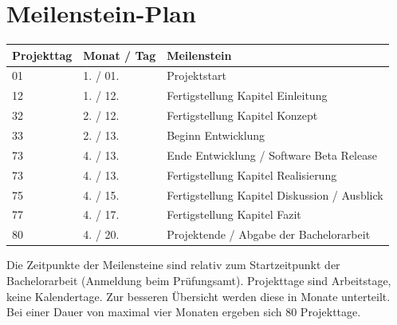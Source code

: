 \section{Meilenstein-Plan}
\label{sec:meilenstein-plan}

{
    \setlength\tabcolsep{1pt} %
    \renewcommand{\arraystretch}{1.3} %
    \begin{tabularx}{\textwidth}{p{}p{}p{}} %
        Projekttag & Monat / Tag & Meilenstein                                  \\
        \midrule
        01         & 1. / 01.    & Projektstart                                 \\
        12         & 1. / 12.    & Fertigstellung Kapitel Einleitung            \\
        32         & 2. / 12.    & Fertigstellung Kapitel Konzept               \\
        33         & 2. / 13.    & Beginn Entwicklung                           \\
        73         & 4. / 13.    & Ende Entwicklung / Software Beta Release     \\
        73         & 4. / 13.    & Fertigstellung Kapitel Realisierung           \\
        75         & 4. / 15.    & Fertigstellung Kapitel Diskussion / Ausblick \\
        77         & 4. / 17.    & Fertigstellung Kapitel Fazit                 \\
        80         & 4. / 20.    & Projektende / Abgabe der Bachelorarbeit      \\
    \end{tabularx}
}

Die Zeitpunkte der Meilensteine sind relativ zum Startzeitpunkt der Bachelorarbeit (Anmeldung beim Prüfungsamt).
Projekttage sind Arbeitstage, keine Kalendertage.
Zur besseren Übersicht werden diese in Monate unterteilt.
Bei einer Dauer von maximal vier Monaten ergeben sich 80 Projekttage.
